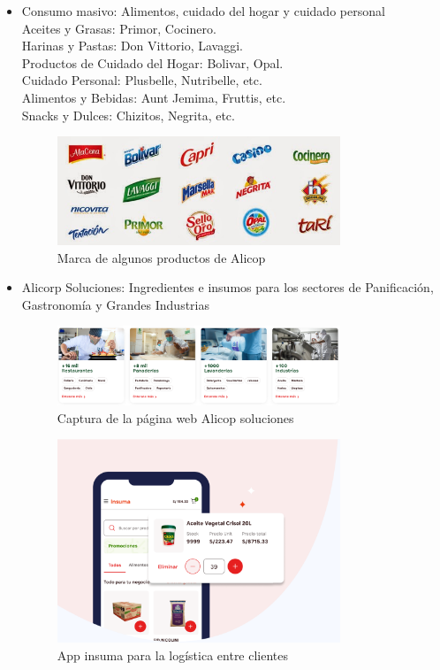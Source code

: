\begin{itemize}
\item Consumo masivo: Alimentos, cuidado del hogar y cuidado personal
\\Aceites y Grasas: Primor, Cocinero. 
\\Harinas y Pastas: Don Vittorio, Lavaggi. 
\\Productos de Cuidado del Hogar: Bolivar, Opal. 
\\Cuidado Personal: Plusbelle, Nutribelle, etc. 
\\Alimentos y Bebidas: Aunt Jemima, Fruttis, etc. 
\\Snacks y Dulces: Chizitos, Negrita, etc. 

\begin{figure}[!ht]
    \centering
    \includegraphics[width=0.8\textwidth]{./figuras/productos_marcas.jpg}
    \caption{Marca de algunos productos de Alicop}
\end{figure}


\item Alicorp Soluciones: Ingredientes e insumos para los sectores de Panificación, Gastronomía y Grandes Industrias\\

\begin{figure}[!ht]
    \centering
    \includegraphics[width=0.8\textwidth]{./figuras/productos_alicorp_soluciones.png}
    \caption{Captura de la página web Alicop soluciones}
\end{figure}

\begin{figure}[!ht]
    \centering
    \includegraphics[width=0.8\textwidth]{./figuras/producto_insuma_app.png}
    \caption{App insuma para la logística entre clientes}
\end{figure}


\end{itemize}
